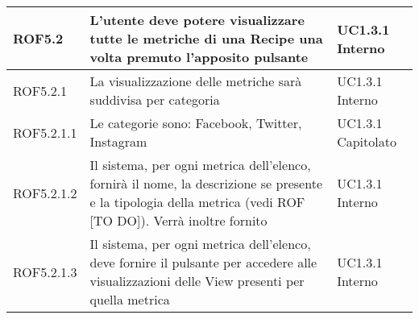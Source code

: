 \begin{center}
\begin{longtable}{| p{2cm} | p{8cm} | p{2cm} |}
		\hline
		ROF5.2  &  L'utente deve potere visualizzare tutte le metriche di una Recipe una volta premuto l'apposito pulsante  &  UC1.3.1 \newline Interno \\
		\hline
		ROF5.2.1  &  La visualizzazione delle metriche sarà suddivisa per categoria  &  UC1.3.1 \newline Interno \\
		\hline
		ROF5.2.1.1  &  Le categorie sono: Facebook, Twitter, Instagram &  UC1.3.1 \newline Capitolato \\		
		\hline
		ROF5.2.1.2  &  Il sistema, per ogni metrica dell'elenco, fornirà il nome, la descrizione se presente e la tipologia della metrica (vedi ROF [TO DO]). Verrà inoltre fornito &  UC1.3.1 \newline Interno \\
		\hline
		ROF5.2.1.3  &  Il sistema, per ogni metrica dell'elenco, deve fornire il pulsante per accedere alle visualizzazioni delle View presenti per quella metrica &  UC1.3.1 \newline Interno \\
		\hline


\end{longtable}
\end{center}
